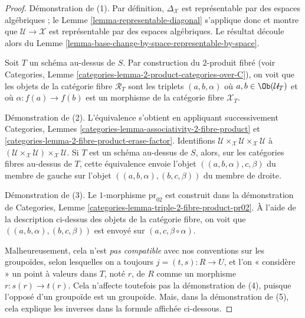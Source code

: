 \begin{proof}
Démonstration de (1). Par définition, $\Delta_\mathcal{X}$ est représentable
par des espaces algébriques ; le
Lemme \ref{lemma-representable-diagonal}
s'applique donc et montre que $\mathcal{U} \to \mathcal{X}$ est représentable
par des espaces algébriques. Le résultat découle alors du
Lemme \ref{lemma-base-change-by-space-representable-by-space}.

\medskip\noindent
Soit $T$ un schéma au-dessus de $S$. Par construction du $2$-produit fibré (voir
Categories, Lemme \ref{categories-lemma-2-product-categories-over-C}),
on voit que les objets de la catégorie fibre $\mathcal{R}_T$
sont les triplets $(a, b, \alpha)$ où $a, b \in \Ob(\mathcal{U}_T)$
et où $\alpha : f(a) \to f(b)$
est un morphisme de la catégorie fibre $\mathcal{X}_T$.

\medskip\noindent
Démonstration de (2). L'équivalence s'obtient en appliquant successivement
Categories, Lemmes \ref{categories-lemma-associativity-2-fibre-product} et
\ref{categories-lemma-2-fibre-product-erase-factor}.
Identifions
$\mathcal{U} \times_\mathcal{X} \mathcal{U} \times_\mathcal{X} \mathcal{U}$
à
$(\mathcal{U} \times_\mathcal{X} \mathcal{U})
\times_\mathcal{X} \mathcal{U}$.
Si $T$ est un schéma au-dessus de $S$, alors, sur les catégories fibres au-dessus de $T$,
cette équivalence envoie l'objet
$((a, b, \alpha), c, \beta)$ du membre de gauche
sur l'objet $((a, b, \alpha), (b, c, \beta))$ du membre de droite.

\medskip\noindent
Démonstration de (3). Le $1$-morphisme $\text{pr}_{02}$ est construit dans la démonstration de
Categories, Lemme \ref{categories-lemma-triple-2-fibre-product-pr02}.
À l'aide de la description ci-dessus des objets de la catégorie fibre,
on voit que $((a, b, \alpha), (b, c, \beta))$
est envoyé sur $(a, c, \beta \circ \alpha)$.

\medskip\noindent
Malheureusement, cela n'est {\it pas compatible} avec nos conventions sur les
groupoïdes, selon lesquelles on a toujours $j = (t, s) : R \to U$, et l'on « considère »
un point à valeurs dans $T$, noté $r$, de $R$ comme un morphisme $r : s(r) \to t(r)$.
Cela n'affecte toutefois pas la démonstration de (4), puisque l'opposé d'un
groupoïde est un groupoïde. Mais, dans la démonstration de (5), cela explique
les inverses dans la formule affichée ci-dessous.


\end{proof}
